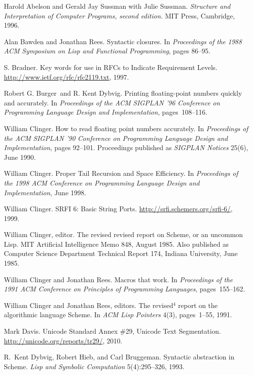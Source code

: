\begin{thebibliography}{999}

Harold Abelson and Gerald Jay Sussman with Julie Sussman.
{\em Structure and Interpretation of Computer Programs, second edition.}
MIT Press, Cambridge, 1996.

Alan Bawden and Jonathan Rees.
Syntactic closures.
In {\em Proceedings of the 1988 ACM Symposium on Lisp and
  Functional Programming}, pages 86--95.

S. Bradner.
Key words for use in RFCs to Indicate Requirement Levels.
\url{http://www.ietf.org/rfc/rfc2119.txt}, 1997.

Robert G. Burger~and R. Kent Dybvig.
Printing floating-point numbers quickly and accurately.
In {\em Proceedings of the ACM SIGPLAN '96 Conference
  on Programming Language Design and Implementation}, pages~108--116.

William Clinger.
How to read floating point numbers accurately.
In {\em Proceedings of the ACM SIGPLAN '90 Conference
  on Programming Language Design and Implementation}, pages 92--101.
Proceedings published as {\em SIGPLAN Notices} 25(6), June 1990.

William Clinger.
Proper Tail Recursion and Space Efficiency.
In {\em Proceedings of the 1998 ACM Conference on Programming
 Language Design and Implementation}, June 1998.

William Clinger.
SRFI 6: Basic String Ports.
\url{http://srfi.schemers.org/srfi-6/}, 1999.

William Clinger, editor.
The revised revised report on Scheme, or an uncommon Lisp.
MIT Artificial Intelligence Memo 848, August 1985.
Also published as Computer Science Department Technical Report 174,
  Indiana University, June 1985.

William Clinger and Jonathan Rees.
Macros that work.
In {\em Proceedings of the 1991 ACM Conference on Principles of
  Programming Languages}, pages~155--162.

William Clinger and Jonathan Rees, editors.
The revised$^4$ report on the algorithmic language Scheme.
In {\em ACM Lisp Pointers} 4(3), pages~1--55, 1991.

Mark Davis.
Unicode Standard Annex \#29, Unicode Text Segmentation.
\url{http://unicode.org/reports/tr29/}, 2010.

R.~Kent Dybvig, Robert Hieb, and Carl Bruggeman.
Syntactic abstraction in Scheme.
{\em Lisp and Symbolic Computation} 5(4):295--326, 1993.


\end{thebibliography}
